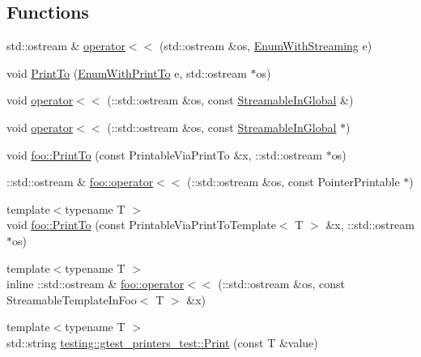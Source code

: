 \subsection*{Functions}
\begin{DoxyCompactItemize}
\item 
std\+::ostream \& \mbox{\hyperlink{googletest-printers-test_8cc_ab3395b6b04bac565a0bd2fb36fbbb339}{operator$<$$<$}} (std\+::ostream \&os, \mbox{\hyperlink{googletest-printers-test_8cc_a52d9f846ca7a081ba3acf88dd6cd46dc}{Enum\+With\+Streaming}} e)
\item 
void \mbox{\hyperlink{googletest-printers-test_8cc_aad8245a4b48cd65607b86153d0f9dbe6}{Print\+To}} (\mbox{\hyperlink{googletest-printers-test_8cc_a904d619d593201ed509be794aed041ec}{Enum\+With\+Print\+To}} e, std\+::ostream $\ast$os)
\item 
void \mbox{\hyperlink{googletest-printers-test_8cc_a7b9d893679e433b9a70f15a9c9d6446c}{operator$<$$<$}} (\+::std\+::ostream \&os, const \mbox{\hyperlink{classStreamableInGlobal}{Streamable\+In\+Global}} \&)
\item 
void \mbox{\hyperlink{googletest-printers-test_8cc_a0794c66a458fe922bfb717080d047311}{operator$<$$<$}} (\+::std\+::ostream \&os, const \mbox{\hyperlink{classStreamableInGlobal}{Streamable\+In\+Global}} $\ast$)
\item 
void \mbox{\hyperlink{namespacefoo_ac435de653934c97045bbdba8c8afbe3f}{foo\+::\+Print\+To}} (const Printable\+Via\+Print\+To \&x, \+::std\+::ostream $\ast$os)
\item 
\+::std\+::ostream \& \mbox{\hyperlink{namespacefoo_a65f8809f6af7f69f5cc842493caf4491}{foo\+::operator$<$$<$}} (\+::std\+::ostream \&os, const Pointer\+Printable $\ast$)
\item 
{\footnotesize template$<$typename T $>$ }\\void \mbox{\hyperlink{namespacefoo_a7b78eba501ea7ff1226a8cb40b6e3d92}{foo\+::\+Print\+To}} (const Printable\+Via\+Print\+To\+Template$<$ T $>$ \&x, \+::std\+::ostream $\ast$os)
\item 
{\footnotesize template$<$typename T $>$ }\\inline \+::std\+::ostream \& \mbox{\hyperlink{namespacefoo_abe04f604d114085b0b9af25600ef00da}{foo\+::operator$<$$<$}} (\+::std\+::ostream \&os, const Streamable\+Template\+In\+Foo$<$ T $>$ \&x)
\item 
{\footnotesize template$<$typename T $>$ }\\std\+::string \mbox{\hyperlink{namespacetesting_1_1gtest__printers__test_ab1fefdb330a473343afa3cc6d46a65f6}{testing\+::gtest\+\_\+printers\+\_\+test\+::\+Print}} (const T \&value)

\end{DoxyCompactItemize}
